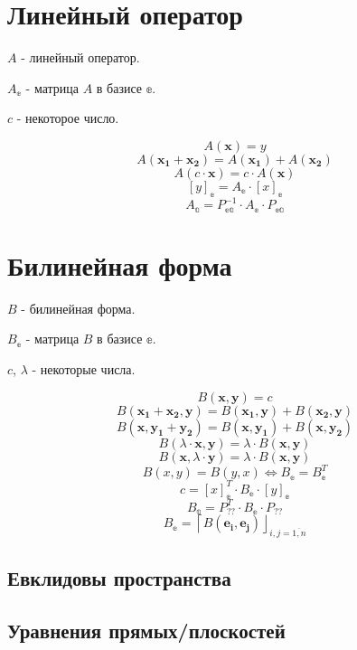 \section{Линейный оператор}

$A$ - линейный оператор.

$A_\mathbb{e}$ - матрица $A$ в базисе $\mathbb{e}$.

$c$ - некоторое число.
 
$$ A(\boldsymbol{x}) = y $$
$$ A(\boldsymbol{x_1} + \boldsymbol{x_2}) = A(\boldsymbol{x_1}) + A(\boldsymbol{x_2}) $$
$$ A(c\cdot\boldsymbol{x}) = c\cdot A(\boldsymbol{x}) $$
$$ [y]_\mathbb{e} = A_\mathbb{e} \cdot [x]_\mathbb{e} $$
$$ A_\mathbb{a} = P_\mathbb{ea}^{-1} \cdot A_\mathbb{e} \cdot P_\mathbb{ea} $$

\section{Билинейная форма}

$B$ - билинейная форма.

$B_\mathbb{e}$ - матрица $B$ в базисе $\mathbb{e}$.

$c$, $\lambda$ - некоторые числа.

$$ B(\boldsymbol{x}, \boldsymbol{y}) = c$$
$$ B(\boldsymbol{x_1} + \boldsymbol{x_2}, \boldsymbol{y}) = B(\boldsymbol{x_1}, \boldsymbol{y}) + B(\boldsymbol{x_2}, \boldsymbol{y}) $$
$$ B(\boldsymbol{x}, \boldsymbol{y_1} + \boldsymbol{y_2}) = B(\boldsymbol{x}, \boldsymbol{y_1}) + B(\boldsymbol{x}, \boldsymbol{y_2}) $$
$$ B(\lambda\cdot \boldsymbol{x}, \boldsymbol{y}) =  \lambda\cdot B(\boldsymbol{x}, \boldsymbol{y})$$
$$ B(\boldsymbol{x}, \lambda\cdot \boldsymbol{y}) =  \lambda\cdot B(\boldsymbol{x}, \boldsymbol{y})$$
$$ B(x, y) = B(y, x) \Leftrightarrow B_\mathbb{e} = B_\mathbb{e}^T $$
$$ c = [x]_\mathbb{e}^T \cdot B_\mathbb{e} \cdot [y]_\mathbb{e} $$
$$ B_\mathbb{a} = P_\mathbb{??}^T \cdot B_\mathbb{e} \cdot P_\mathbb{??} $$
$$ B_\mathbb{e} = \left\lceil B(\boldsymbol{e_i},\boldsymbol{e_j})\right\rfloor_{i,j=\overline{1,n}} $$

\subsection{Евклидовы пространства}

\subsection{Уравнения прямых/плоскостей}

